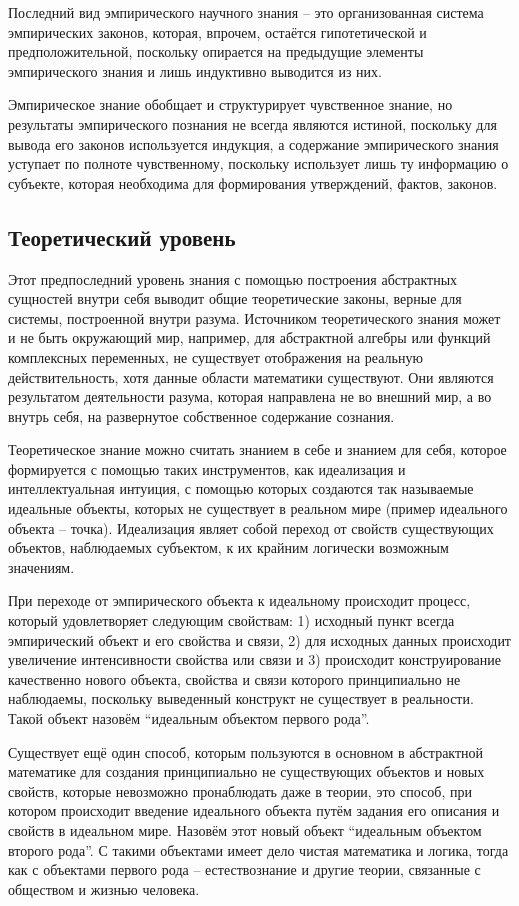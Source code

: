 \documentclass[14pt]{article}
\begin{document}
Последний вид эмпирического научного знания -- это организованная система эмпирических законов, которая, впрочем, остаётся гипотетической и предположительной, поскольку опирается на предыдущие элементы эмпирического знания и лишь индуктивно выводится из них. 

Эмпирическое знание обобщает и структурирует чувственное знание, но результаты эмпирического познания не всегда являются истиной, поскольку для вывода его законов используется индукция, а содержание эмпирического знания уступает по полноте чувственному, поскольку использует лишь ту информацию о субъекте, которая необходима для формирования утверждений, фактов, законов.

\subsection{Теоретический уровень}

Этот предпоследний уровень знания с помощью построения абстрактных сущностей внутри себя выводит общие теоретические законы, верные для системы, построенной внутри разума. Источником теоретического знания может и не быть окружающий мир, например, для абстрактной алгебры или функций комплексных переменных, не существует отображения на реальную действительность, хотя данные области математики существуют. Они являются результатом деятельности разума, которая направлена не во внешний мир, а во внутрь себя, на развернутое собственное содержание сознания. 

Теоретическое знание можно считать знанием в себе и знанием для себя, которое формируется с помощью таких инструментов, как идеализация и интеллектуальная интуиция, с помощью которых создаются так называемые идеальные объекты, которых не существует в реальном мире (пример идеального объекта -- точка). Идеализация являет собой переход от свойств существующих объектов, наблюдаемых субъектом, к их крайним логически возможным значениям. 

При переходе от эмпирического объекта к идеальному происходит процесс, который удовлетворяет следующим свойствам: 1) исходный пункт всегда эмпирический объект и его свойства и связи, 2) для исходных данных происходит увеличение интенсивности свойства или связи и 3) происходит конструирование качественно нового объекта, свойства и связи которого принципиально не наблюдаемы, поскольку выведенный конструкт не существует в реальности. Такой объект назовём ``идеальным объектом первого рода''.

Существует ещё один способ, которым пользуются в основном в абстрактной математике для создания принципиально не существующих объектов и новых свойств, которые невозможно пронаблюдать даже в теории, это способ, при котором происходит введение идеального объекта путём задания его описания и свойств в идеальном мире. Назовём этот новый объект ``идеальным объектом второго рода''. С такими объектами имеет дело чистая математика и логика, тогда как с объектами первого рода -- естествознание и другие теории, связанные с обществом и жизнью человека. 
\end{document}
